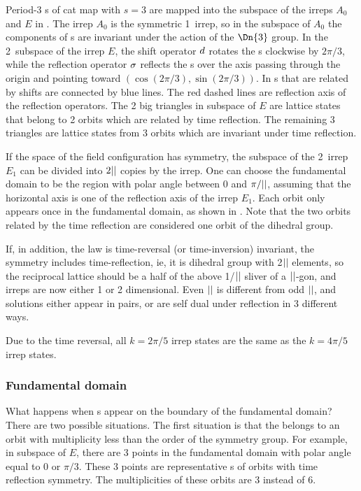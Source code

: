 Period-3 {\lattstate}s of cat map with $s=3$ are mapped into the subspace
of the irreps $A_0$ and $E$ in .
The irrep $A_0$ is the symmetric 1\dmn\ irrep, so in the subspace of $A_0$ the components
of {\lattstate}s are invariant under the action of the $\Dn{3}$ group.
In the 2\dmn\ subspace of the irrep $E$, the shift operator $d$ rotates the
{\lattstate}s clockwise by $2\pi/3$, while the reflection operator $\sigma$ reflects the {\lattstate}s
over the axis passing through the origin and pointing toward $(\cos(2\pi/3),\sin(2\pi/3))$.
In 
{\lattstate}s that are related by shifts are connected by blue lines.
The red dashed lines are reflection axis of the reflection operators.
The 2 big triangles in  subspace of $E$ are lattice states
that belong to 2 orbits which are related by time reflection. The remaining 3 triangles
are lattice states from 3 orbits which are invariant under time reflection.

If the space of the field configuration has \Dn{\cl{}} symmetry,
the subspace of the 2\dmn\ irrep $E_1$ can be divided
into $2{||}$ copies by the irrep. One can choose the fundamental domain to be the region
with polar angle between 0 and $\pi/{||}$, assuming that the horizontal axis is one of the
reflection axis of the irrep $E_1$. Each orbit only appears once in the fundamental domain,
as shown in . Note that the two orbits related by
the time reflection are considered one orbit of the dihedral group.

If, in addition, the law is time-reversal (or time-inversion) invariant,
the symmetry includes time-reflection, ie, it is dihedral group 
with 2${||}$ elements, so the reciprocal lattice should be a half of the
above 1/${||}$ sliver of a ${||}$-gon, and irreps are now either 1 or 2
dimensional. Even ${||}$ is different from odd ${||}$, and solutions either appear
in pairs, or are self dual under reflection in 3 different ways.

Due to the time
reversal, all $k={2\pi}/{5}$ irrep states are the same as the
$k={4\pi}/{5}$ irrep states.


\subsubsection{Fundamental domain}
What happens when {\lattstate}s appear on the boundary of the fundamental domain?
There are two possible situations. The first situation is that the {\lattstate} belongs to an
orbit with multiplicity less than the order of the symmetry group. For example,
in  subspace of $E$, there are 3 points in the fundamental domain
with polar angle equal to 0 or $\pi/3$. These 3 points are representative {\lattstate}s of orbits
with time reflection symmetry. The multiplicities of these orbits are 3 instead of 6.


